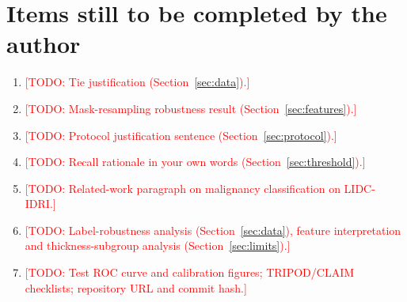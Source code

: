 \documentclass[journal]{IEEEtran}
\newcommand{\TODO}[1]{\textcolor{red}{[TODO: #1]}}
\begin{document}
\section{Items still to be completed by the author}
\begin{enumerate}
  \item \TODO{Tie justification (Section~\ref{sec:data}).}
  \item \TODO{Mask-resampling robustness result (Section~\ref{sec:features}).}
  \item \TODO{Protocol justification sentence (Section~\ref{sec:protocol}).}
  \item \TODO{Recall rationale in your own words (Section~\ref{sec:threshold}).}
  \item \TODO{Related-work paragraph on malignancy classification on LIDC-IDRI.}
  \item \TODO{Label-robustness analysis (Section~\ref{sec:data}), feature interpretation and thickness-subgroup analysis (Section~\ref{sec:limits}).}
  \item \TODO{Test ROC curve and calibration figures; TRIPOD/CLAIM checklists; repository URL and commit hash.}
\end{enumerate}



\end{document}
